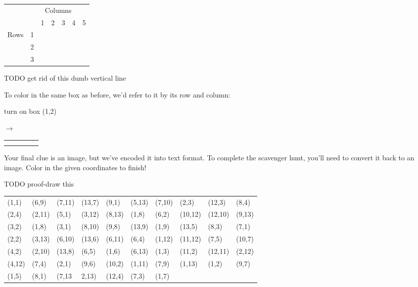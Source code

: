 \documentclass{article}
\begin{document}
\begin{center}
\begin{tabular}{*{7}{c|}}
\multicolumn{1}{c}{} & \multicolumn{6}{c}{Columns} \\ 
\multicolumn{2}{c}{} & \multicolumn{1}{c}{1} & \multicolumn{1}{c}{2} & \multicolumn{1}{c}{3} & \multicolumn{1}{c}{4} & \multicolumn{1}{c}{5} 
\\ \cline{3-7}
\multirow{3}{*}{Rows} & 1 & & & & & \\ \cline{3-7}
                      & 2 & & & & & \\ \cline{3-7}
                      & 3 & & & & & \\ \cline{3-7}
\end{tabular}
\end{center}

TODO get rid of this dumb vertical line

To color in the same box as before, we'd refer to it by its row and column: 

\begin{minipage}[c]{.4\linewidth}
\center
turn on box (1,2) 
\end{minipage}
\begin{minipage}[c]{.2\linewidth} $\rightarrow$ \end{minipage}
\begin{minipage}[c]{.4\linewidth}
\center
\begin{tabular}{*{5}{|c}|}
\hline
 &  & & & \\ \hline
 & & & & \\ \hline
 & & & & \\ \hline
\end{tabular}
\end{minipage}

Your final clue is an image, but we've encoded it into text format. To complete the scavenger hunt, you'll need to convert it back to an image. Color in the given coordinates to finish!

\newpage

TODO proof-draw this
\begin{tabular}{|*{10}{l}|}
\hline
(1,1)  &  (6,9)  &  (7,11)  &  (13,7)  &  (9,1)  &  (5,13)  &  (7,10)  &  (2,3)  &  (12,3)  &  (8,4) \\ 
(2,4)  &  (2,11)  &  (5,1)  &  (3,12)  &  (8,13)  &  (1,8)  &  (6,2)  &  (10,12)  &  (12,10)  &  (9,13) \\
(3,2)  &  (1,8)  &  (3,1)  &  (8,10)  &  (9,8)  &  (13,9)  &  (1,9)  &  (13,5)  &  (8,3)  &  (7,1) \\ 
(2,2)  &  (3,13)  &  (6,10)  &  (13,6)  &  (6,11)  &  (6,4)  &  (1,12)  &  (11,12)  &  (7,5)  &  (10,7) \\ 
(4,2)  &  (2,10)  &  (13,8)  &  (6,5)  &  (1,6)  &  (6,13)  &  (1,3)  &  (11,2)  &  (12,11)  &  (2,12) \\
(4,12)  &  (7,4)  &  (2,1)  &  (9,6)  &  (10,2)  &  (1,11)  &  (7,9)  &  (1,13)  &  (1,2)  &  (9,7) \\ 
(1,5)  &  (8,1)  &  (7,13 &2,13)  &  (12,4)  &  (7,3)  &  (1,7)  &  &  &  \\
\hline
\end{tabular}

\vspace{1cm}

\end{document}
